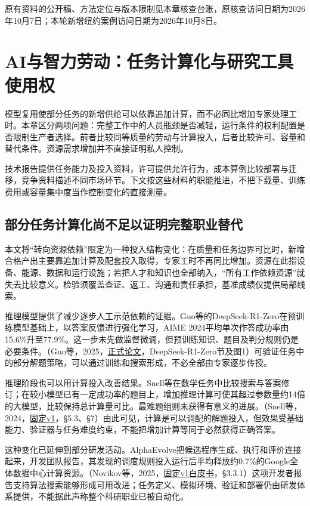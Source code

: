 \documentclass[UTF8,fontset=windows,12pt,a4paper,oneside,openany]{ctexbook}
\begin{document}
原有资料的公开稿、方法定位与版本限制见本章核查台账，原核查访问日期为2026年10月7日；本轮新增纽约案例访问日期为2026年10月8日。

\chapter{AI与智力劳动：任务计算化与研究工具使用权}\label{ch:7}

模型复用使部分任务的新增供给可以依靠追加计算，而不必同比增加专家处理工时。本章区分两项问题：完整工作中的人员瓶颈是否减轻，运行条件的权利配置是否限制生产者选择。前者比较同等质量的劳动与计算投入，后者比较许可、容量和替代条件。资源需求增加并不直接证明私人控制。

技术报告提供任务能力及投入资料，许可提供允许行为，成本算例比较部署与迁移，竞争资料描述不同市场环节。下文按这些材料的职能推进，不把下载量、训练费用或容量集中度当作控制变化的直接测量。

\section{部分任务计算化尚不足以证明完整职业替代}

本文将“转向资源依赖”限定为一种投入结构变化：在质量和任务边界可比时，新增合格产出主要靠追加计算及配套投入取得，专家工时不再同比增加。资源在此指设备、能源、数据和运行设施；若把人才和知识也全部纳入，“所有工作依赖资源”就失去比较意义。检验须覆盖查证、返工、沟通和责任承担，基准成绩仅提供局部线索。

推理模型提供了减少逐步人工示范依赖的证据。Guo等的DeepSeek-R1-Zero在预训练模型基础上，以答案反馈进行强化学习，AIME 2024平均单次作答成功率由15.6\%升至77.9\%。这一步未先做监督微调，但预训练知识、题目及判分规则仍是必要条件。（Guo等，2025，\href{https://www.nature.com/articles/s41586-025-09422-z}{正式论文}，DeepSeek-R1-Zero节及图1）可验证任务中的部分解题策略，可以通过训练和搜索形成，不必全部由专家逐步传授。

推理阶段也可以用计算投入改善结果。Snell等在数学任务中比较搜索与答案修订；在较小模型已有一定成功率的题目上，增加推理计算可使其超过参数量约14倍的大模型，比较保持总计算量可比。最难题组则未获得有意义的进展。（Snell等，2024，\href{https://arxiv.org/html/2408.03314v1}{固定v1}，§5.3、§7）由此可见，计算是可以调配的解题投入，但效果受基础能力、验证器与任务难度约束，不能把增加计算等同于必然获得正确答案。

这种变化已延伸到部分研发活动。AlphaEvolve把候选程序生成、执行和评价连接起来，开发团队报告，其发现的调度规则投入运行后平均释放约0.7\%的Google全体数据中心计算资源。（Novikov等，2025，\href{https://arxiv.org/html/2506.13131v1}{固定v1白皮书}，§3.3.1）这项开发者报告支持算法搜索能够形成可用改进；任务定义、模拟环境、验证和部署仍由研发体系提供，不能据此声称整个科研职业已被自动化。
\end{document}
